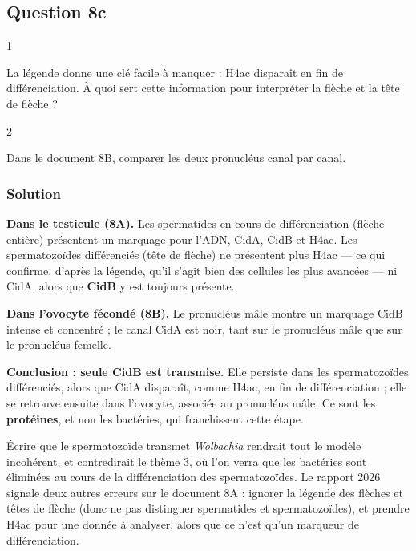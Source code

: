 \documentclass[11pt,a4paper]{article}
\begin{document}
\hypertarget{question-8c}{%
\subsection{Question 8c}\label{question-8c}}

\begin{indication}{1}

La légende donne une clé facile à manquer : H4ac disparaît en fin de différenciation. À quoi sert cette information pour interpréter la flèche et la tête de flèche ?

\end{indication}

\begin{indication}{2}

Dans le document 8B, comparer les deux pronucléus canal par canal.

\end{indication}

\hypertarget{solution-59}{%
\subsubsection{Solution}\label{solution-59}}

\textbf{Dans le testicule (8A).} Les spermatides en cours de différenciation (flèche entière) présentent un marquage pour l'ADN, CidA, CidB et H4ac. Les spermatozoïdes différenciés (tête de flèche) ne présentent plus H4ac --- ce qui confirme, d'après la légende, qu'il s'agit bien des cellules les plus avancées --- ni CidA, alors que \textbf{CidB} y est toujours présente.

\textbf{Dans l'ovocyte fécondé (8B).} Le pronucléus mâle montre un marquage CidB intense et concentré ; le canal CidA est noir, tant sur le pronucléus mâle que sur le pronucléus femelle.

\textbf{Conclusion : seule CidB est transmise.} Elle persiste dans les spermatozoïdes différenciés, alors que CidA disparaît, comme H4ac, en fin de différenciation ; elle se retrouve ensuite dans l'ovocyte, associée au pronucléus mâle. Ce sont les \textbf{protéines}, et non les bactéries, qui franchissent cette étape.

\begin{piege}

Écrire que le spermatozoïde transmet \emph{Wolbachia} rendrait tout le modèle incohérent, et contredirait le thème 3, où l'on verra que les bactéries sont éliminées au cours de la différenciation des spermatozoïdes. Le rapport 2026 signale deux autres erreurs sur le document 8A : ignorer la légende des flèches et têtes de flèche (donc ne pas distinguer spermatides et spermatozoïdes), et prendre H4ac pour une donnée à analyser, alors que ce n'est qu'un marqueur de différenciation.

\end{piege}
\end{document}
